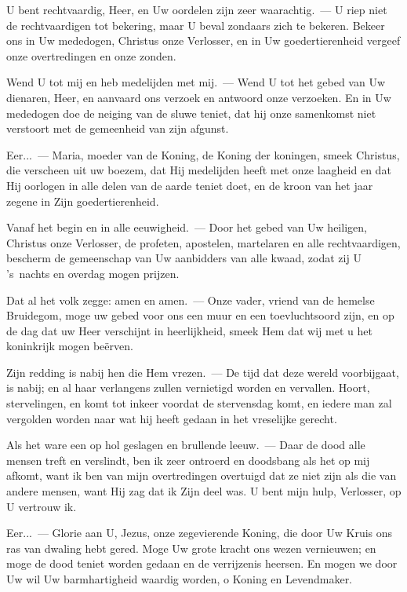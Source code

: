 \documentclass[12pt,twoside,a5paper]{article}
\begin{document}
\begin{halfparskip}
   U bent rechtvaardig, Heer, en Uw oordelen zijn zeer waarachtig.~--- U riep niet de rechtvaardigen tot bekering, maar U beval zondaars zich te bekeren. Bekeer ons in Uw mededogen, Christus onze Verlosser, en in Uw goedertierenheid vergeef onze overtredingen en onze zonden.

  Wend U tot mij en heb medelijden met mij.~--- Wend U tot het gebed van Uw dienaren, Heer, en aanvaard ons verzoek en antwoord onze verzoeken. En in Uw mededogen doe de neiging van de sluwe teniet, dat hij onze samenkomst niet verstoort met de gemeenheid van zijn afgunst.

  Eer...~--- Maria, moeder van de Koning, de Koning der koningen, smeek Christus, die verscheen uit uw boezem, dat Hij medelijden heeft met onze laagheid en dat Hij oorlogen in alle delen van de aarde teniet doet, en de kroon van het jaar zegene in Zijn goedertierenheid.

  Vanaf het begin en in alle eeuwigheid.~--- Door het gebed van Uw heiligen, Christus onze Verlosser, de profeten, apostelen, martelaren en alle rechtvaardigen, bescherm de gemeenschap van Uw aanbidders van alle kwaad, zodat zij U 's~nachts en overdag mogen prijzen.

  Dat al het volk zegge: amen en amen.~--- Onze vader, vriend van de hemelse Bruidegom, moge uw gebed voor ons een muur en een toevluchtsoord zijn, en op de dag dat uw Heer verschijnt in heerlijkheid, smeek Hem dat wij met u het koninkrijk mogen beërven.
\end{halfparskip}

\begin{halfparskip}
   Zijn redding is nabij hen die Hem vrezen.~--- De tijd dat deze wereld voorbijgaat, is nabij; en al haar verlangens zullen vernietigd worden en vervallen. Hoort, stervelingen, en komt tot inkeer voordat de stervensdag komt, en iedere man zal vergolden worden naar wat hij heeft gedaan in het vreselijke gerecht.

  Als het ware een op hol geslagen en brullende leeuw.~--- Daar de dood alle mensen treft en verslindt, ben ik zeer ontroerd en doodsbang als het op mij afkomt, want ik ben van mijn overtredingen overtuigd dat ze niet zijn als die van andere mensen, want Hij zag dat ik Zijn deel was. U bent mijn hulp, Verlosser, op U vertrouw ik.

  Eer...~--- Glorie aan U, Jezus, onze zegevierende Koning, die door Uw Kruis ons ras van dwaling hebt gered. Moge Uw grote kracht ons wezen vernieuwen; en moge de dood teniet worden gedaan en de verrijzenis heersen. En mogen we door Uw wil Uw barmhartigheid waardig worden, o Koning en Levendmaker.
\end{halfparskip}
\end{document}
